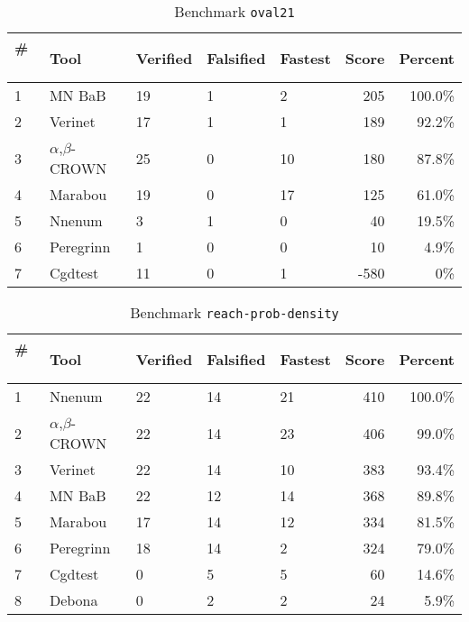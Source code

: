 
\begin{table}[h]
\begin{center}
\caption{Benchmark \texttt{oval21}} \label{tab:cat_{cat}}
{\setlength{\tabcolsep}{2pt}
\begin{tabular}[h]{@{}lllllrr@{}}
\toprule
\textbf{\# ~} & \textbf{Tool} & \textbf{Verified} & \textbf{Falsified} & \textbf{Fastest} & \textbf{Score} & \textbf{Percent}\\
\midrule
1 & MN BaB & 19 & 1 & 2 & 205 & 100.0\% \\
2 & Verinet & 17 & 1 & 1 & 189 & 92.2\% \\
3 & $\alpha$,$\beta$-CROWN & 25 & 0 & 10 & 180 & 87.8\% \\
4 & Marabou & 19 & 0 & 17 & 125 & 61.0\% \\
5 & Nnenum & 3 & 1 & 0 & 40 & 19.5\% \\
6 & Peregrinn & 1 & 0 & 0 & 10 & 4.9\% \\
7 & Cgdtest & 11 & 0 & 1 & -580 & 0\% \\
\bottomrule
\end{tabular}
}
\end{center}
\end{table}




\begin{table}[h]
\begin{center}
\caption{Benchmark \texttt{reach-prob-density}} \label{tab:cat_{cat}}
{\setlength{\tabcolsep}{2pt}
\begin{tabular}[h]{@{}lllllrr@{}}
\toprule
\textbf{\# ~} & \textbf{Tool} & \textbf{Verified} & \textbf{Falsified} & \textbf{Fastest} & \textbf{Score} & \textbf{Percent}\\
\midrule
1 & Nnenum & 22 & 14 & 21 & 410 & 100.0\% \\
2 & $\alpha$,$\beta$-CROWN & 22 & 14 & 23 & 406 & 99.0\% \\
3 & Verinet & 22 & 14 & 10 & 383 & 93.4\% \\
4 & MN BaB & 22 & 12 & 14 & 368 & 89.8\% \\
5 & Marabou & 17 & 14 & 12 & 334 & 81.5\% \\
6 & Peregrinn & 18 & 14 & 2 & 324 & 79.0\% \\
7 & Cgdtest & 0 & 5 & 5 & 60 & 14.6\% \\
8 & Debona & 0 & 2 & 2 & 24 & 5.9\% \\
\bottomrule
\end{tabular}
}
\end{center}
\end{table}



